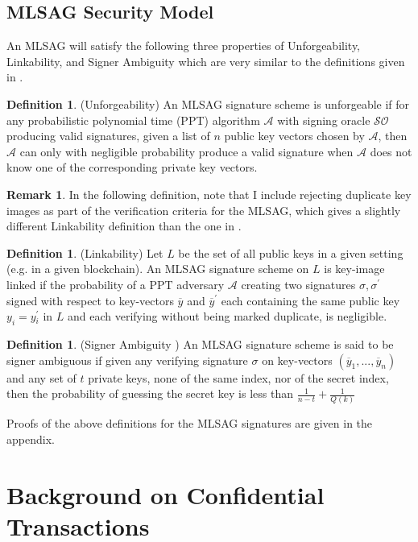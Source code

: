 \documentclass[12pt,english]{mrl}
\theoremstyle{definition}
\newtheorem{Defn}[lem]{Definition}
\newtheorem{rem}[lem]{Remark}
\newenvironment{defn}{\begin{Defn}\rm}{\end{Defn}}
\numberwithin{equation}{section}
\numberwithin{figure}{section}
\numberwithin{equation}{section}
\numberwithin{equation}{section}
\numberwithin{figure}{section}
\begin{document}
\subsection{MLSAG Security Model}

An MLSAG will satisfy the following three properties of Unforgeability,
Linkability, and Signer Ambiguity which are very similar to the definitions
given in \cite{LWW}. 
\begin{defn}
\label{def:(Unforgeability)--An}(Unforgeability) %
{} An MLSAG signature scheme is unforgeable if for any probabilistic polynomial time (PPT) algorithm
$\mathcal{A}$ with signing oracle $\mathcal{SO}$ producing valid
signatures, given a list of $n$ public key vectors chosen by $\mathcal{A}$,
then $\mathcal{A}$ can only with negligible probability produce a
valid signature when $\mathcal{A}$ does not know one of the corresponding
private key vectors. 
\end{defn}
\begin{rem}
In the following definition, note that I include rejecting duplicate
key images as part of the verification criteria for the MLSAG, which gives a slightly different Linkability definition than the one in \cite{LWW}. 
\end{rem}
\begin{defn}
\label{def:(Linkability)}(Linkability) Let $L$ be the set of all
public keys in a given setting (e.g. in a given blockchain). An MLSAG signature scheme on $L$ is key-image
linked if the probability of a PPT adversary $\mathcal{A}$ creating
two signatures $\sigma,\sigma^{\prime}$ signed with respect to key-vectors
$\overline{y}$ and $\overline{y}^{\prime}$ each containing the same
public key $y_{i}=y$$_{i}^{\prime}$ in $L$ and each verifying without being marked duplicate,
is negligible. %
\end{defn}
\begin{defn}
\label{def:(Signer-Ambiguity-)}(Signer Ambiguity %
) An MLSAG signature scheme is said to be signer ambiguous if given
any verifying signature $\sigma$ on key-vectors $\left(\overline{y}_{1},...,\overline{y}_{n}\right)$
and any set of $t$ private keys, none of the same index, nor of the
secret index, then the probability of guessing the secret key is less
than $\frac{1}{n-t}+\frac{1}{Q\left(k\right)}$ 
\end{defn}
Proofs of the above definitions for the MLSAG signatures are given in the appendix. 

\section{\label{sec:Background-on-ConfidentialT}Background on Confidential
Transactions}
\end{document}
